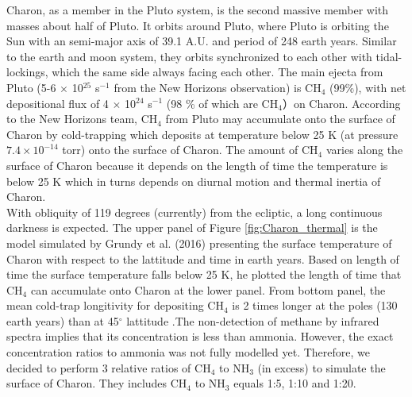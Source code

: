 Charon, as a member in the Pluto system, is the second massive member with masses about half of Pluto. It orbits around Pluto, where Pluto is orbiting the Sun with an semi-major axis of 39.1 A.U. and period of 248 earth years. Similar to the earth and moon system, they orbits synchronized to each other with tidal-lockings, which the same side always facing each other. The main ejecta from Pluto (5-6 $\times$ 10$^{25}$ s$^{-1}$ from the New Horizons observation) is CH$_4$ (99\%), with net depositional flux of 4 $\times$ 10$^{24}$ s$^{-1}$ (98 \% of which are CH$_4$）on Charon\cite{hoey2017rarefied}. According to the New Horizons team, CH$_4$ from Pluto may accumulate onto the surface of Charon by cold-trapping which deposits at temperature below 25 K (at pressure $7.4 \times 10^{-14}$ torr) onto the surface of Charon\cite{grundy2016formation}. The amount of CH$_4$ varies along the surface of Charon because it depends on the length of time the temperature is below 25 K which in turns depends on diurnal motion and thermal inertia of Charon.\\

With obliquity of 119 degrees (currently) from the ecliptic, a long continuous darkness is expected. The upper panel of Figure \ref{fig:Charon_thermal} is the model simulated by Grundy et al. (2016)\cite{grundy2016formation} presenting the surface temperature of Charon with respect to the lattitude and time in earth years. Based on length of time the surface temperature falls below 25 K, he plotted the length of time that CH$_4$ can accumulate onto Charon at the lower panel. From bottom panel, the mean cold-trap longitivity for depositing CH$_4$ is 2 times longer at the poles (130 earth years) than at 45$^{\circ}$ lattitude \cite{grundy2016formation}.The non-detection of methane by infrared spectra implies that its concentration is less than ammonia. However, the exact concentration ratios to ammonia was not fully modelled yet. Therefore, we decided to perform 3 relative ratios of CH$_4$ to NH$_3$ (in excess) to simulate the surface of Charon. They includes CH$_4$ to NH$_3$ equals 1:5, 1:10 and 1:20.\\

